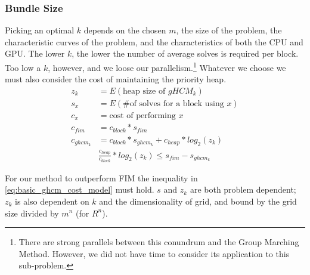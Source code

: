 \documentclass[11pt]{article}       %
\begin{document}
\subsubsection{Bundle Size}\label{sec:bundle_size}
Picking an optimal $k$ depends on the chosen $m$, the size of the problem, the characteristic curves of the problem, and the characteristics of both the CPU and GPU. The lower $k$, the lower the number of average solves is required per block. Too low a $k$, however, and we loose our parallelism.\footnote{There are strong parallels between this conundrum and the Group Marching Method. However, we did not have time to consider its application to this sub-problem.} Whatever we choose we must also consider the cost of maintaining the priority heap.
\begin{equation} \label{eq:basic_ghcm_cost_model}
\begin{split}
z_k			&= E(\text{heap size of $gHCM_k$})					\\
s_x			&= E(\text{\# of solves for a block using $x$}) 	\\
c_x 		&= \text{cost of performing $x$}					\\
c_{fim}		&= c_{block} * s_{fim}								\\
c_{ghcm_k}	&= c_{block} * s_{ghcm_k} + c_{heap} * log_2(z_k)	\\
& \frac{c_{heap}}{c_{block}} * log_2(z_k) \le s_{fim} - s_{ghcm_k}
\end{split}
\end{equation}

For our method to outperform FIM the inequality in \autoref{eq:basic_ghcm_cost_model} must hold. $s$ and $z_k$ are both problem dependent; $z_k$ is also dependent on $k$ and the dimensionality of grid, and bound by the grid size divided by $m^n$ (for $R^n$).
\end{document}
